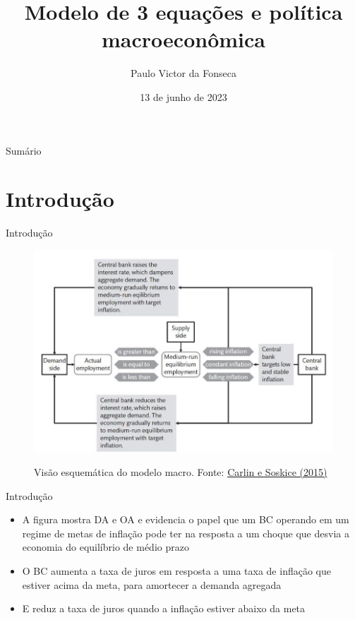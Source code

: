 \documentclass[10pt]{beamer}
\title[]{Modelo de 3 equações e política macroeconômica}
\author[]{Paulo Victor da Fonseca}
\date{13 de junho de 2023}
\begin{document}
\begin{frame}[plain]
\end{frame}

\begin{frame}{Sumário}
    \tableofcontents
\end{frame}

\section{Introdução}
\begin{frame}
    {Introdução}
    \begin{figure}
        \href{https://bookdown.org/robohay/economicsnotes/Figures/Policy/BoEFig.jpg}{\includegraphics[width=.65\textwidth]{./figures/aula15_fig3.jpg}}
        \caption{Visão esquemática do modelo macro. Fonte: \href{https://bookdown.org/robohay/economicsnotes/Figures/Policy/BoEFig.jpg}{Carlin e Soskice (2015)}}
    \end{figure}
\end{frame}

\begin{frame}
    {Introdução}
    \begin{itemize}
        \item A figura mostra DA e OA e evidencia o papel que um BC operando em um regime de metas de inflação pode ter na resposta a um choque que desvia a economia do equilíbrio de médio prazo\bigskip
        \item O BC aumenta a taxa de juros em resposta a uma taxa de inflação que estiver acima da meta, para amortecer a demanda agregada\bigskip
        \item E reduz a taxa de juros quando a inflação estiver abaixo da meta
    \end{itemize}
\end{frame}
\end{document}
